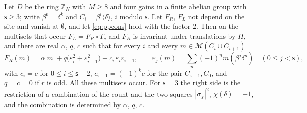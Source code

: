 \begin{theorem}\label{thm:fgadj}
Let $D$ be the ring $\mathbb{Z}_N$ with $M\ge8$ and four gains in a finite abelian group with $\mathsf{s}\ge3$; write $\beta^{\mathsf{s}}=\delta^{k}$ and $C_i=\beta^{i}\langle\delta\rangle$, $i$ modulo $\mathsf{s}$. Let $F_R$, $F_L$ not depend on the site and vanish at $\emptyset$, and let \eqref{eq:ppcons} hold with the factor $2$. Then on the multisets that occur $F_L=F_R\circ T_c$ and $F_R$ is invariant under translations by $H$, and there are real $\alpha$, $q$, $c$ such that for every $i$ and every $m\in\mathcal{M}(C_i\cup C_{i+1})$
\[
F_R(m)=\alpha|m|+q\bigl(\varepsilon_i^{2}+\varepsilon_{i+1}^{2}\bigr)+c_i\,\varepsilon_i\varepsilon_{i+1},\qquad \varepsilon_j(m)=\sum_{n}(-1)^{n}m(\beta^{j}\delta^{n})\quad(0\le j<\mathsf{s}),
\]
with $c_i=c$ for $0\le i\le\mathsf{s}-2$, $c_{\mathsf{s}-1}=(-1)^{k}c$ for the pair $C_{\mathsf{s}-1},C_0$, and $q=c=0$ if $r$ is odd. All these multisets occur. For $\mathsf{s}=3$ the right side is the restriction of a combination of the count and the two squares $|\sigma_\chi|^{2}$, $\chi(\delta)=-1$, and the combination is determined by $\alpha$, $q$, $c$.
\end{theorem}
